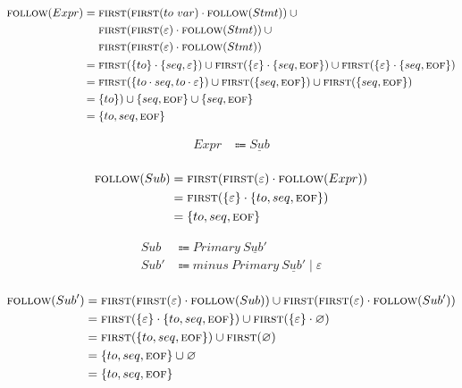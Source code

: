 \documentclass{report}
\newcommand{\Empty}{\varnothing}
\newcommand{\Null}{\varepsilon}
\newcommand{\Seq}{\cdot}
\newcommand{\Spc}{\ }
\newcommand{\Union}{\mathrel{|}}
\newcommand{\FIRST}{\textsc{first}}
\newcommand{\FOLLOW}{\textsc{follow}}
\newcommand{\EOF}{\textsc{eof}}
\newcommand{\Arrow}{\Coloneq}
\newcommand{\NT}[1]{{#1}}
\newcommand{\T}[1]{{#1}}
\begin{document}
\begin{equation*}
  \begin{aligned}
    \FOLLOW(\NT{Expr}) &= \begin{aligned}[t] &\FIRST(\FIRST(\T{to} \Spc \T{var}) \Seq \FOLLOW(\NT{Stmt})) \cup{}\\
    &\FIRST(\FIRST(\Null) \Seq \FOLLOW(\NT{Stmt})) \cup{}\\
    &\FIRST(\FIRST(\Null) \Seq \FOLLOW(\NT{Stmt}))\end{aligned}\\
    &= \FIRST(\{\T{to}\} \Seq \{\T{seq}, \Null\}) \cup \FIRST(\{\Null\} \Seq \{\T{seq}, \EOF\}) \cup \FIRST(\{\Null\} \Seq \{\T{seq}, \EOF\})\\
    &= \FIRST(\{\T{to} \Seq \T{seq}, \T{to} \Seq \Null\}) \cup \FIRST(\{\T{seq}, \EOF\}) \cup \FIRST(\{\T{seq}, \EOF\})\\
    &= \{\T{to}\}) \cup \{\T{seq}, \EOF\} \cup \{\T{seq}, \EOF\}\\
    &= \{\T{to}, \T{seq}, \EOF\}
  \end{aligned}
\end{equation*}

\begin{equation*}
  \begin{aligned}
    \NT{Expr} &\Arrow \underline{\NT{Sub}}\\
  \end{aligned}
\end{equation*}

\begin{equation*}
  \begin{aligned}
    \FOLLOW(\NT{Sub}) &= \FIRST(\FIRST(\Null) \Seq \FOLLOW(\NT{Expr})) \\
    &= \FIRST(\{\Null\} \Seq \{\T{to}, \T{seq}, \EOF\})\\
    &= \{\T{to}, \T{seq}, \EOF\}
  \end{aligned}
\end{equation*}

\begin{equation*}
  \begin{aligned}
    \NT{Sub} &\Arrow \NT{Primary} \Spc \underline{\NT{Sub'}}\\
    \NT{Sub'} &\Arrow \T{minus} \Spc \NT{Primary} \Spc \underline{\NT{Sub'}} \Union \Null\\
  \end{aligned}
\end{equation*}

\begin{equation*}
  \begin{aligned}
    \FOLLOW(\NT{Sub}') &= \FIRST(\FIRST(\Null) \Seq \FOLLOW(\NT{Sub})) \cup \FIRST(\FIRST(\Null) \Seq \FOLLOW(\NT{Sub'}))\\
    &= \FIRST(\{\Null\} \Seq \{\T{to}, \T{seq}, \EOF\}) \cup \FIRST(\{\Null\} \Seq \Empty)\\
    &= \FIRST(\{\T{to}, \T{seq}, \EOF\}) \cup \FIRST(\Empty)\\
    &= \{\T{to}, \T{seq}, \EOF\} \cup \Empty\\
    &= \{\T{to}, \T{seq}, \EOF\}
  \end{aligned}
\end{equation*}
\end{document}
